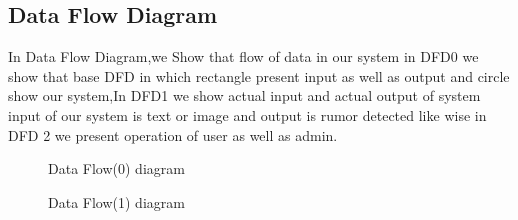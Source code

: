 \documentclass[oneside,a4paper,12pt]{report}
\begin{document}
\subsection {Data Flow Diagram}
\item In Data Flow Diagram,we Show that ﬂow of data in our system in DFD0 we show that base DFD in which rectangle present input as well as output and circle show our system,In DFD1 we show actual input and actual output of system input of our system is text or image and output is rumor detected like wise in DFD 2 we present operation of user as well as admin.\\
\begin{center}
	\begin{figure}[!htbp]
		\centering
	  \caption{Data Flow(0) diagram}
	  \label{fig:act-dig}
	\end{figure}
\end{center}  
\newpage 
\begin{center}
	\begin{figure}[!htbp]
		\centering
	  \caption{Data Flow(1) diagram}
	  \label{fig:act-dig}
	\end{figure}
\end{center}  
\end{document}
